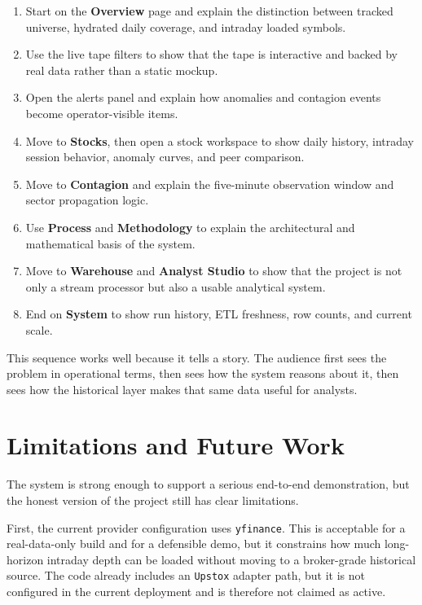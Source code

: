 \documentclass[11pt,a4paper]{article}
\begin{document}
\begin{enumerate}[leftmargin=1.8em]
    \item Start on the \textbf{Overview} page and explain the distinction between tracked universe, hydrated daily coverage, and intraday loaded symbols.
    \item Use the live tape filters to show that the tape is interactive and backed by real data rather than a static mockup.
    \item Open the alerts panel and explain how anomalies and contagion events become operator-visible items.
    \item Move to \textbf{Stocks}, then open a stock workspace to show daily history, intraday session behavior, anomaly curves, and peer comparison.
    \item Move to \textbf{Contagion} and explain the five-minute observation window and sector propagation logic.
    \item Use \textbf{Process} and \textbf{Methodology} to explain the architectural and mathematical basis of the system.
    \item Move to \textbf{Warehouse} and \textbf{Analyst Studio} to show that the project is not only a stream processor but also a usable analytical system.
    \item End on \textbf{System} to show run history, ETL freshness, row counts, and current scale.
\end{enumerate}

This sequence works well because it tells a story. The audience first sees the problem in operational terms, then sees how the system reasons about it, then sees how the historical layer makes that same data useful for analysts.

\section{Limitations and Future Work}
The system is strong enough to support a serious end-to-end demonstration, but the honest version of the project still has clear limitations.

First, the current provider configuration uses \texttt{yfinance}. This is acceptable for a real-data-only build and for a defensible demo, but it constrains how much long-horizon intraday depth can be loaded without moving to a broker-grade historical source. The code already includes an \texttt{Upstox} adapter path, but it is not configured in the current deployment and is therefore not claimed as active.
\end{document}
